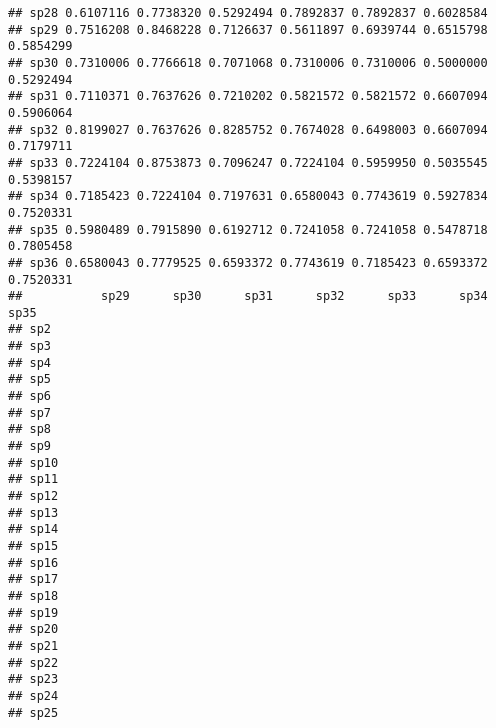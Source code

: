 \documentclass[
]{book}
\begin{document}
\begin{verbatim}
## sp28 0.6107116 0.7738320 0.5292494 0.7892837 0.7892837 0.6028584          
## sp29 0.7516208 0.8468228 0.7126637 0.5611897 0.6939744 0.6515798 0.5854299
## sp30 0.7310006 0.7766618 0.7071068 0.7310006 0.7310006 0.5000000 0.5292494
## sp31 0.7110371 0.7637626 0.7210202 0.5821572 0.5821572 0.6607094 0.5906064
## sp32 0.8199027 0.7637626 0.8285752 0.7674028 0.6498003 0.6607094 0.7179711
## sp33 0.7224104 0.8753873 0.7096247 0.7224104 0.5959950 0.5035545 0.5398157
## sp34 0.7185423 0.7224104 0.7197631 0.6580043 0.7743619 0.5927834 0.7520331
## sp35 0.5980489 0.7915890 0.6192712 0.7241058 0.7241058 0.5478718 0.7805458
## sp36 0.6580043 0.7779525 0.6593372 0.7743619 0.7185423 0.6593372 0.7520331
##           sp29      sp30      sp31      sp32      sp33      sp34      sp35
## sp2                                                                       
## sp3                                                                       
## sp4                                                                       
## sp5                                                                       
## sp6                                                                       
## sp7                                                                       
## sp8                                                                       
## sp9                                                                       
## sp10                                                                      
## sp11                                                                      
## sp12                                                                      
## sp13                                                                      
## sp14                                                                      
## sp15                                                                      
## sp16                                                                      
## sp17                                                                      
## sp18                                                                      
## sp19                                                                      
## sp20                                                                      
## sp21                                                                      
## sp22                                                                      
## sp23                                                                      
## sp24                                                                      
## sp25                                                                      

\end{verbatim}
\end{document}
